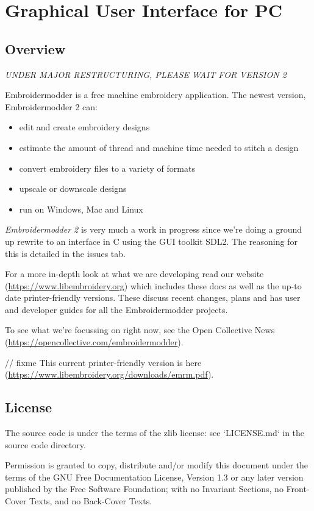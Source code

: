 \documentclass[a4paper]{report}
\begin{document}
\section{Graphical User Interface for PC}
\label{GUI}

\subsection{Overview}

\emph{UNDER MAJOR RESTRUCTURING, PLEASE WAIT FOR VERSION 2}

Embroidermodder is a free machine embroidery application.
The newest version, Embroidermodder 2 can:

\begin{itemize}
\item edit and create embroidery designs
\item estimate the amount of thread and machine time needed to stitch a design
\item convert embroidery files to a variety of formats
\item upscale or downscale designs
\item run on Windows, Mac and Linux
\end{itemize}

\emph{Embroidermodder 2} is very much a work in progress since we're doing a ground
up rewrite to an interface in C using the GUI toolkit SDL2.
The reasoning for this is detailed in the issues tab.

For a more in-depth look at what we are developing read our
website (\url{https://www.libembroidery.org}) which includes these docs as well
as the up-to date printer-friendly versions. These discuss recent changes,
plans and has user and developer guides for all the Embroidermodder projects.

To see what we're focussing on right now, see the Open Collective
News (\url{https://opencollective.com/embroidermodder}).

// fixme
This current printer-friendly version
is here (\url{https://www.libembroidery.org/downloads/emrm.pdf}).

\subsection{License}

The source code is under the terms of the zlib license: see `LICENSE.md`
in the source code directory.

Permission is granted to copy, distribute and/or modify this document
under the terms of the GNU Free Documentation License, Version 1.3
or any later version published by the Free Software Foundation;
with no Invariant Sections, no Front-Cover Texts, and no Back-Cover Texts.
\end{document}
